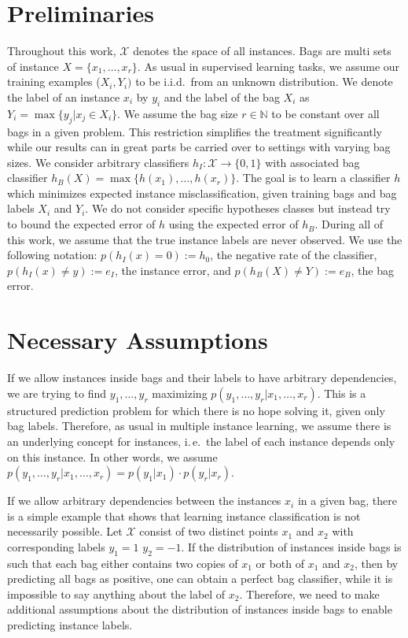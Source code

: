 \section{Preliminaries}
Throughout this work, $\mathcal{X}$ denotes the space of all instances. Bags are multi sets of instance $X=\{x_1,\dotsc, x_r\}$.
As usual in supervised learning tasks, we assume our training examples ($X_i,Y_i)$ to be i.i.d.\ from an unknown distribution.
We denote the label of an instance $x_i$ by $y_i$ and the label of the bag $X_i$ as $Y_i = \max\{y_j | x_j \in  X_i\}$.
We assume the bag size $r\in \mathbb{N}$ to be constant over all bags in a given problem. This restriction simplifies the treatment
significantly while our results can in great parts be carried over to settings with varying bag sizes.
We consider arbitrary classifiers $h_I\colon \mathcal{X} \rightarrow \{0, 1\}$ with associated bag classifier
$h_B(X) = \max \{h(x_1),\dotsc,h(x_r)\}$.
The goal is to learn a classifier $h$ which minimizes expected instance misclassification, given training bags and bag labels
$X_i$ and $Y_i$.
We do not consider specific hypotheses classes but instead try to bound the expected error of $h$ using the expected error of $h_B$.
During all of this work, we assume that the true instance labels are never observed.
We use the following notation: $p(h_I(x)=0):= h_0$, the negative rate of the classifier,
$p(h_I(x) \neq y) := e_I$, the instance error, and $p(h_B(X) \neq Y) := e_B$, the bag error.

\section{Necessary Assumptions}
If we allow instances inside bags and their labels to have arbitrary dependencies, we are trying to find
$y_1,\dotsc,y_r$ maximizing $p(y_1,\dotsc, y_r | x_1, \dotsc, x_r)$. This is a structured 
prediction problem for which there is no hope solving it, given only bag labels.
Therefore, as usual in multiple instance learning, we assume there is an underlying concept for instances,
i.\,e.\ the label of each instance depends only on this instance.
In other words, we assume $p(y_1,\dotsc, y_r | x_1, \dotsc, x_r)=p(y_1|x_1) \cdot p(y_r|x_r)$.

If we allow arbitrary dependencies between the instances $x_i$ in a given bag, there is a simple example 
\citep{sabato2009homogeneous} that shows that learning instance classification is not necessarily possible.
Let $\mathcal{X}$ consist of two
distinct points $x_1$ and $x_2$ with corresponding labels $y_1 = 1$ $y_2 = -1$. If the distribution
of instances inside bags is such that each bag either contains two copies of $x_1$ or both of $x_1$ and $x_2$, then
by predicting all bags as positive, one can obtain a perfect bag classifier, while it is impossible to say anything
about the label of $x_2$.
Therefore, we need to make additional assumptions about the distribution of instances inside bags to enable
predicting instance labels.

